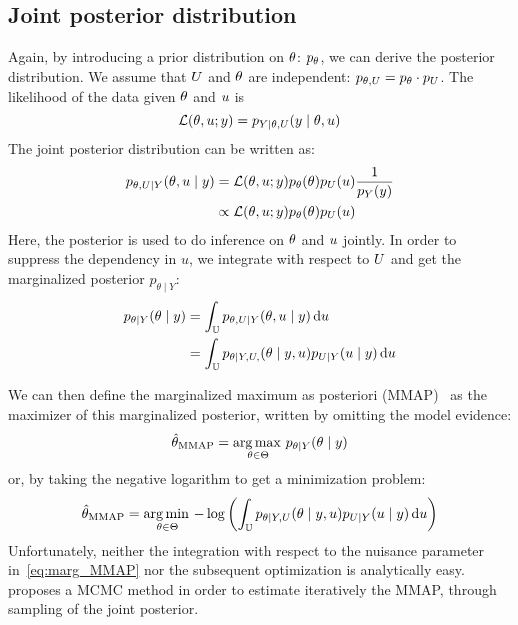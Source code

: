 \documentclass[../../Main_ManuscritThese.tex]{subfiles}
\begin{document}
\subsection{Joint posterior distribution}
Again, by introducing a prior distribution on $\theta$: $p_{\theta}$, we can derive the posterior distribution. We assume that $U$ and $\theta$ are independent: $p_{\theta, U} = p_{\theta}\cdot p_{U}$.
The likelihood of the data given $\theta$ and $u$ is
\begin{equation}
  \mathcal{L}(\theta,u;y) = p_{Y \mid \theta, U}(y\mid \theta,u)
\end{equation}
The joint posterior distribution can be written as:
\begin{align}
  p_{\theta,U \mid Y}(\theta,u \mid y) &= \mathcal{L}(\theta,u;y)p_{\theta}(\theta)p_{U}(u) \frac{1}{p_Y(y)} \\
  &\propto \mathcal{L}(\theta,u;y)p_{\theta}(\theta)p_{U}(u)
\end{align}
Here, the posterior is used to do inference on $\theta$ and $u$ jointly. In order to suppress the dependency in $u$, we integrate with respect to $U$ and get the marginalized posterior $p_{\theta \mid Y}$:
\begin{align}
  p_{\theta \mid Y}(\theta \mid y) &= \int_{\mathbb{U}} p_{\theta,U\mid Y}(\theta,u\mid y)\,\mathrm{d}u \label{eq:marg_MMAP}\\
                             &= \int_{\mathbb{U}}p_{\theta \mid Y, U,}(\theta \mid y, u) p_{U\mid Y}(u \mid y)\,\mathrm{d}u
\end{align}

We can then define the marginalized maximum as posteriori (MMAP)~\cite{doucet_marginal_2002} as the  maximizer of this marginalized posterior, written by omitting the model evidence:
\begin{equation}
  \label{eq:def_MMAP}
  \hat{\theta}_{\mathrm{MMAP}} = \operatorname*{arg\,max \,}_{\theta\in\Theta} p_{\theta \mid Y}(\theta\mid y)
\end{equation}
or, by taking the negative logarithm to get a minimization problem:
\begin{equation}
\hat{\theta}_{\mathrm{MMAP}} = \operatorname*{arg\,min \,}_{\theta\in\Theta} -\log \left(\int_{\mathbb{U}} p_{\theta\mid Y,U}(\theta\mid y, u) p_{U \mid Y}(u \mid y)\,\mathrm{d}u \right)
\end{equation}
Unfortunately, neither the integration with respect to the nuisance parameter in~\eqref{eq:marg_MMAP} nor the subsequent optimization is analytically easy. \cite{doucet_marginal_2002} proposes a MCMC method in order to estimate iteratively the MMAP, through sampling of the joint posterior.
\end{document}
